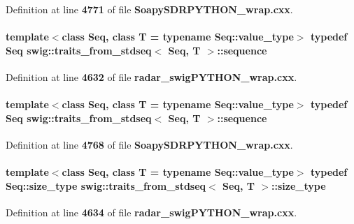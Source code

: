 Definition at line {\bf 4771} of file {\bf Soapy\+S\+D\+R\+P\+Y\+T\+H\+O\+N\+\_\+wrap.\+cxx}.

\paragraph[{sequence}]{\setlength{\rightskip}{0pt plus 5cm}template$<$class Seq, class T = typename Seq\+::value\+\_\+type$>$ typedef Seq {\bf swig\+::traits\+\_\+from\+\_\+stdseq}$<$ Seq, T $>$\+::{\bf sequence}}\label{structswig_1_1traits__from__stdseq_ad784f89c80055794b0da097a644ab7ab}


Definition at line {\bf 4632} of file {\bf radar\+\_\+swig\+P\+Y\+T\+H\+O\+N\+\_\+wrap.\+cxx}.

\paragraph[{sequence}]{\setlength{\rightskip}{0pt plus 5cm}template$<$class Seq, class T = typename Seq\+::value\+\_\+type$>$ typedef Seq {\bf swig\+::traits\+\_\+from\+\_\+stdseq}$<$ Seq, T $>$\+::{\bf sequence}}\label{structswig_1_1traits__from__stdseq_ad784f89c80055794b0da097a644ab7ab}


Definition at line {\bf 4768} of file {\bf Soapy\+S\+D\+R\+P\+Y\+T\+H\+O\+N\+\_\+wrap.\+cxx}.

\paragraph[{size\+\_\+type}]{\setlength{\rightskip}{0pt plus 5cm}template$<$class Seq, class T = typename Seq\+::value\+\_\+type$>$ typedef Seq\+::size\+\_\+type {\bf swig\+::traits\+\_\+from\+\_\+stdseq}$<$ Seq, T $>$\+::{\bf size\+\_\+type}}\label{structswig_1_1traits__from__stdseq_a1189d4a7cea9e522a7c10ed7ff2ce232}


Definition at line {\bf 4634} of file {\bf radar\+\_\+swig\+P\+Y\+T\+H\+O\+N\+\_\+wrap.\+cxx}.

